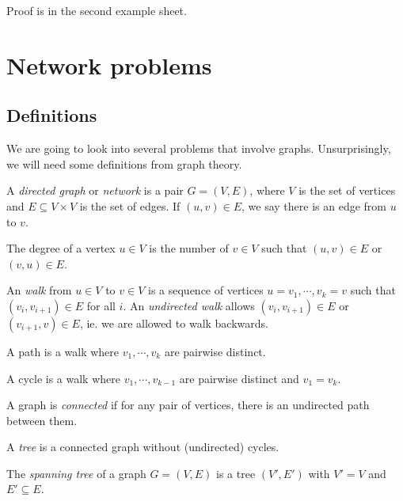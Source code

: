 \documentclass[a4paper]{article}
\begin{document}
Proof is in the second example sheet.

\section{Network problems}
\subsection{Definitions}
We are going to look into several problems that involve graphs. Unsurprisingly, we will need some definitions from graph theory.
\begin{defi}
  A \emph{directed graph} or \emph{network} is a pair $G = (V, E)$, where $V$ is the set of vertices and $E\subseteq V\times V$ is the set of edges. If $(u, v)\in E$, we say there is an edge from $u$ to $v$.
\end{defi}

\begin{defi}[Degree]
  The degree of a vertex $u \in V$ is the number of $v\in V$ such that $(u, v)\in E$ or $(v, u)\in E$.
\end{defi}

\begin{defi}[Walk]
  An \emph{walk} from $u\in V$ to $v\in V$ is a sequence of vertices $u = v_1, \cdots, v_k = v$ such that $(v_i, v_{i + 1})\in E$ for all $i$. An \emph{undirected walk} allows $(v_i, v_{i + 1})\in E$ or $(v_{i + 1}, v)\in E$, ie. we are allowed to walk backwards.
\end{defi}

\begin{defi}[Path]
  A path is a walk where $v_1, \cdots, v_k$ are pairwise distinct.
\end{defi}

\begin{defi}[Cycle]
  A cycle is a walk where $v_1, \cdots, v_{k - 1}$ are pairwise distinct and $v_1 = v_k$.
\end{defi}

\begin{defi}
  A graph is \emph{connected} if for any pair of vertices, there is an undirected path between them.
\end{defi}

\begin{defi}[Tree]
  A \emph{tree} is a connected graph without (undirected) cycles.
\end{defi}

\begin{defi}
  The \emph{spanning tree} of a graph $G = (V, E)$ is a tree $(V', E')$ with $V' = V$ and $E'\subseteq E$.
\end{defi}
\end{document}
